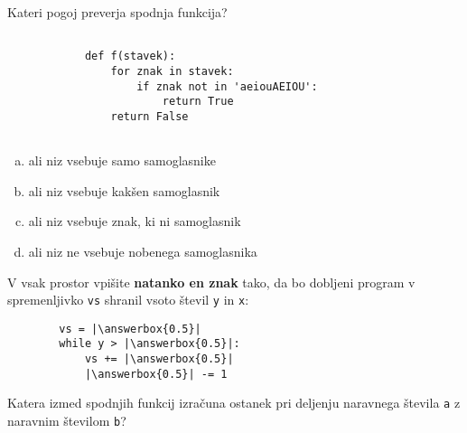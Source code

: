\documentclass[arhiv, 10pt]{../izpit}
\newcommand{\inlinepy}[1]{\texttt{#1}}
\newcommand{\answerbox}[1]{\framebox{\vphantom{\large M}\hspace{#1cm}}}
\begin{document}
        \naloga*

        \begin{multicols}{2}
        \noindent
        Kateri pogoj preverja spodnja funkcija?
        \begin{verbatim}
        
            def f(stavek):
                for znak in stavek:
                    if znak not in 'aeiouAEIOU':
                        return True
                return False
            
        \end{verbatim}

        \begin{enumerate}[(a)]
\item ali niz vsebuje samo samoglasnike
\item ali niz vsebuje kakšen samoglasnik
\item ali niz vsebuje znak, ki ni samoglasnik
\item ali niz ne vsebuje nobenega samoglasnika
\end{enumerate}

        \end{multicols}
    
        \naloga*
        \begin{multicols}{2}
        \noindent
        V vsak prostor vpišite \textbf{natanko en znak} tako, da bo dobljeni program v spremenljivko \inlinepy{vs} shranil vsoto števil \inlinepy{y} in \inlinepy{x}:
        
        \columnbreak
        \begin{verbatim}
        vs = |\answerbox{0.5}|
        while y > |\answerbox{0.5}|:
            vs += |\answerbox{0.5}|
            |\answerbox{0.5}| -= 1
        \end{verbatim}
        \end{multicols}
    
        \clearpage
        \naloga
        
        Katera izmed spodnjih funkcij izračuna ostanek pri deljenju naravnega števila \inlinepy{a} z naravnim številom \inlinepy{b}?
    
\end{document}
